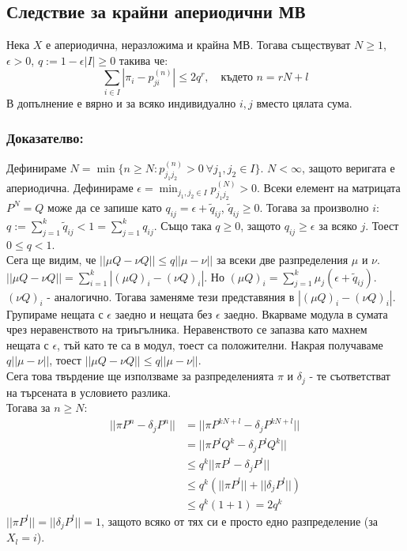 \documentclass{article}
\begin{document}
\subsection{Следствие за крайни апериодични МВ}
Нека $X$ е апериодична, неразложима и крайна МВ. Тогава съществуват $N \geq 1$, $\epsilon > 0$, $q := 1 - \epsilon|I| \geq 0$ такива че:
$$\sum_{i \in I} |\pi_i - p_{ji}^{(n)}| \leq 2q^r, \quad \text{където } n = rN + l$$
В допълнение е вярно и за всяко индивидуално $i,j$ вместо цялата сума.

\subsubsection*{Доказателво:}
Дефинираме $N = \min\{n \geq N : p_{j_1j_2}^{(n)} > 0 \ \forall j_1,j_2 \in I\}$. $N < \infty$, защото веригата е апериодична. Дефинираме $\epsilon = \min_{j_1,j_2 \in I} p_{j_1j_2}^{(N)} > 0$. 
Всеки елемент на матрицата $P^N = Q$ може да се запише като $q_{ij} = \epsilon + \tilde{q}_{ij}$, $\tilde{q}_{ij} \geq 0$. 
Тогава за произволно $i$: $q := \sum_{j=1}^k \tilde{q}_{ij} < 1 = \sum_{j=1}^k q_{ij}$. 
Също така $q \geq 0$, защото $q_{ij} \geq \epsilon$ за всяко $j$. Тоест $0 \leq q < 1$. \\

Сега ще видим, че $||\mu Q - \nu Q|| \leq q||\mu - \nu||$ за всеки две разпределения $\mu$ и $\nu$. 
$||\mu Q - \nu Q|| = \sum_{i=1}^k |(\mu Q)_i - (\nu Q)_i|$. 
Но $(\mu Q)_i = \sum_{j=1}^k \mu_j (\epsilon + \tilde{q}_{ij})$. $(\nu Q)_i$ - аналогично. Тогава заменяме тези 
представяния в $|(\mu Q)_i - (\nu Q)_i|$. Групираме нещата с $\epsilon$ заедно и нещата без $\epsilon$ заедно. 
Вкарваме модула в сумата чрез неравенството на триъгълника. Неравенството се запазва като махнем нещата с $\epsilon$, 
тъй като те са в модул, тоест са положителни. Накрая получаваме $q||\mu - \nu||$, тоест $||\mu Q - \nu Q|| \leq q||\mu - \nu||$. \\

Сега това твърдение ще използваме за разпределенията $\pi$ и $\delta_j$ - те съответстват на търсената в условието разлика. \\
Тогава за $n \geq N$:
\begin{align*}
||\pi P^n - \delta_j P^n|| &= ||\pi P^{kN + l} - \delta_j P^{kN + l}|| \\
&= ||\pi P^l Q^k - \delta_j P^l Q^k|| \\
&\leq q^k ||\pi P^l - \delta_j P^l|| \\
&\leq q^k (||\pi P^l|| + ||\delta_j P^l||) \\
&\leq q^k (1 + 1) = 2q^k
\end{align*}
$||\pi P^l|| = ||\delta_j P^l|| = 1$, защото всяко от тях си е просто едно разпределение (за $X_l = i$). \\
\end{document}
